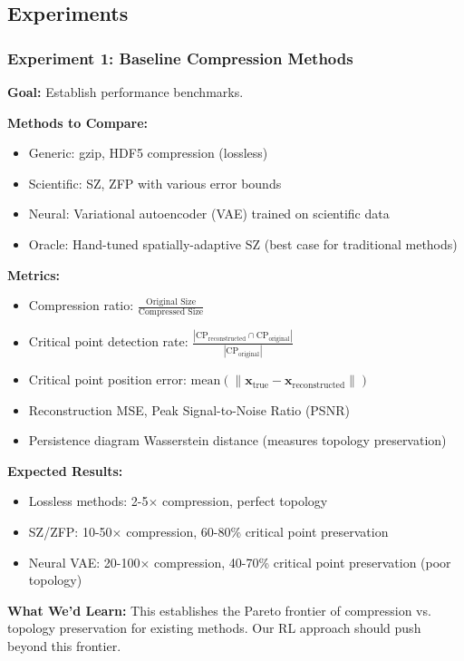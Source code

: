 \documentclass[11pt]{article}
\begin{document}
\subsection{Experiments}

\subsubsection{Experiment 1: Baseline Compression Methods}

\textbf{Goal:} Establish performance benchmarks.

\textbf{Methods to Compare:}
\begin{itemize}
    \item Generic: gzip, HDF5 compression (lossless)
    \item Scientific: SZ, ZFP with various error bounds
    \item Neural: Variational autoencoder (VAE) trained on scientific data
    \item Oracle: Hand-tuned spatially-adaptive SZ (best case for traditional methods)
\end{itemize}

\textbf{Metrics:}
\begin{itemize}
    \item Compression ratio: $\frac{\text{Original Size}}{\text{Compressed Size}}$
    \item Critical point detection rate: $\frac{|\text{CP}_\text{reconstructed} \cap \text{CP}_\text{original}|}{|\text{CP}_\text{original}|}$
    \item Critical point position error: $\text{mean}(\|\mathbf{x}_\text{true} - \mathbf{x}_\text{reconstructed}\|)$
    \item Reconstruction MSE, Peak Signal-to-Noise Ratio (PSNR)
    \item Persistence diagram Wasserstein distance (measures topology preservation)
\end{itemize}

\textbf{Expected Results:}
\begin{itemize}
    \item Lossless methods: 2-5$\times$ compression, perfect topology
    \item SZ/ZFP: 10-50$\times$ compression, 60-80\% critical point preservation
    \item Neural VAE: 20-100$\times$ compression, 40-70\% critical point preservation (poor topology)
\end{itemize}

\textbf{What We'd Learn:} This establishes the Pareto frontier of compression vs. topology preservation for existing methods. Our RL approach should push beyond this frontier.
\end{document}
